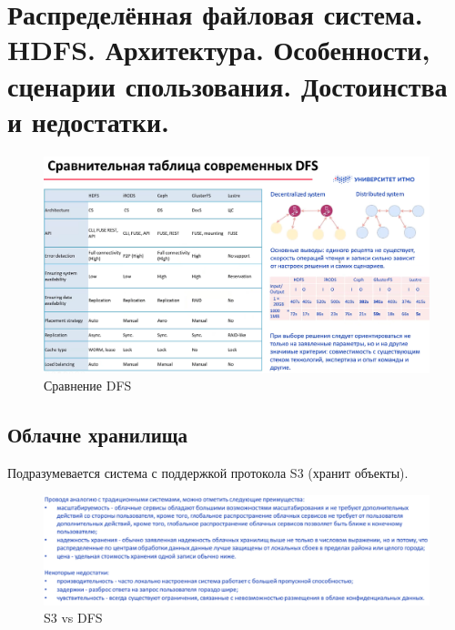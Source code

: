 \section{Распределённая файловая система. HDFS. Архитектура. Особенности, сценарии спользования. Достоинства и недостатки.}


\begin{figure}[h]
	\centering
	\begin{minipage}[b]{0.8\textwidth}
		\includegraphics[width=\textwidth]{images/dfs.png}
		\caption{Сравнение DFS}
	\end{minipage}
\end{figure}

\subsection*{Облачне хранилища}

Подразумевается система с поддержкой протокола S3 (хранит объекты).

\begin{figure}[h]
	\centering
	\begin{minipage}[b]{0.8\textwidth}
		\includegraphics[width=\textwidth]{images/s3dfs.png}
		\caption{S3 vs DFS}
	\end{minipage}
\end{figure}